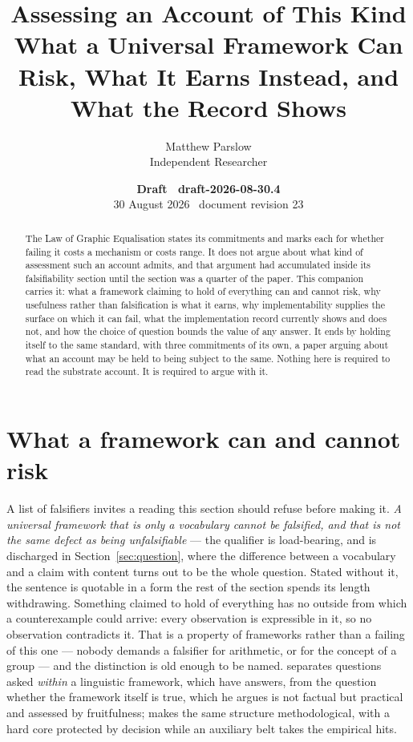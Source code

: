 \documentclass[11pt,a4paper]{article}
\title{Assessing an Account of This Kind\\\large What a Universal Framework Can Risk, What It Earns Instead, and What the Record Shows}
\author{Matthew Parslow\\Independent Researcher}
\date{\textbf{Draft \textemdash\ draft-2026-08-30.4}\\[2pt]30 August 2026 \textbullet\ document revision 23}
\theoremstyle{remark}\newtheorem{remark}[definition]{Remark}
\begin{document}
\maketitle
\begin{center}
\end{center}
\vspace{1em}
\begin{abstract}
The Law of Graphic Equalisation states its commitments and marks each for whether failing it costs a
mechanism or costs range. It does not argue about what kind of assessment such an account admits, and
that argument had accumulated inside its falsifiability section until the section was a quarter of the
paper. This companion carries it: what a framework claiming to hold of everything can and cannot risk,
why usefulness rather than falsification is what it earns, why implementability supplies the surface on
which it can fail, what the implementation record currently shows and does not, and how the choice of
question bounds the value of any answer. It ends by holding itself to the same standard, with three commitments of its own, a paper arguing about what an account may be held to being subject to the same. Nothing here is required to read the
substrate account. It is required to argue with it.
\end{abstract}

\section{What a framework can and cannot risk}\label{sec:risk}
A list of falsifiers invites a reading this section
should refuse before making it. \emph{A universal framework that is only a vocabulary cannot be
falsified, and that is not the same defect as being unfalsifiable} --- the qualifier is load-bearing,
and is discharged in Section~\ref{sec:question}, where the difference between a vocabulary and a claim with
content turns out to be the whole question. Stated without it, the sentence is quotable in a form the rest of the section spends its length withdrawing. Something claimed to hold of everything has no outside from which
a counterexample could arrive: every observation is expressible in it, so no observation contradicts
it. That is a property of frameworks rather than a failing of this one --- nobody demands a falsifier
for arithmetic, or for the concept of a group --- and the distinction is old enough to be named.
\citet{carnap1950} separates questions asked \emph{within} a linguistic framework, which have answers,
from the question whether the framework itself is true, which he argues is not factual but practical
and assessed by fruitfulness; \citet{lakatos1970} makes the same structure methodological, with a hard
core protected by decision while an auxiliary belt takes the empirical hits.
\end{document}
